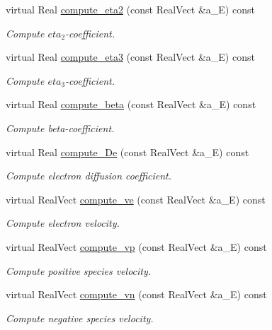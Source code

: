 \begin{DoxyCompactItemize}
virtual Real \hyperlink{classmorrow__lowke_a1baf521b1e6991c067b78b8716d57b50}{compute\+\_\+eta2} (const Real\+Vect \&a\+\_\+E) const 
\begin{DoxyCompactList}\small\item\em Compute $eta_2$-\/coefficient. \end{DoxyCompactList}\item 
virtual Real \hyperlink{classmorrow__lowke_aa57f5b8b949601b8245017ae04316211}{compute\+\_\+eta3} (const Real\+Vect \&a\+\_\+E) const 
\begin{DoxyCompactList}\small\item\em Compute $eta_3$-\/coefficient. \end{DoxyCompactList}\item 
virtual Real \hyperlink{classmorrow__lowke_a1bc7bf04dbe6b9940ff0910508af6c8f}{compute\+\_\+beta} (const Real\+Vect \&a\+\_\+E) const 
\begin{DoxyCompactList}\small\item\em Compute beta-\/coefficient. \end{DoxyCompactList}\item 
virtual Real \hyperlink{classmorrow__lowke_a3fd1e01eea79ea03354c1949425ec358}{compute\+\_\+\+De} (const Real\+Vect \&a\+\_\+E) const 
\begin{DoxyCompactList}\small\item\em Compute electron diffusion coefficient. \end{DoxyCompactList}\item 
virtual Real\+Vect \hyperlink{classmorrow__lowke_ab0c14286935d5b58141dfbd939e2de17}{compute\+\_\+ve} (const Real\+Vect \&a\+\_\+E) const 
\begin{DoxyCompactList}\small\item\em Compute electron velocity. \end{DoxyCompactList}\item 
virtual Real\+Vect \hyperlink{classmorrow__lowke_a7c128a0c9846ac803e6d5d91f6ddd112}{compute\+\_\+vp} (const Real\+Vect \&a\+\_\+E) const 
\begin{DoxyCompactList}\small\item\em Compute positive species velocity. \end{DoxyCompactList}\item 
virtual Real\+Vect \hyperlink{classmorrow__lowke_a3097c9b0e934196053045fbb40ab5f50}{compute\+\_\+vn} (const Real\+Vect \&a\+\_\+E) const 
\begin{DoxyCompactList}\small\item\em Compute negative species velocity. \end{DoxyCompactList}\end{DoxyCompactItemize}
